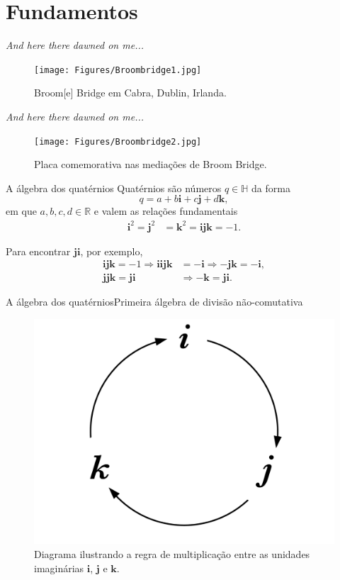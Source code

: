 \documentclass[10pt,compress]{beamer}
\newcommand{\qi}{\boldsymbol{i}}
\newcommand{\qj}{\boldsymbol{j}}
\newcommand{\qk}{\boldsymbol{k}}
\begin{document}
\section{Fundamentos}\label{sec:fundamentos}

\begin{frame}{\textit{And here there dawned on me...}}
\begin{figure}
\centering
\texttt{[image: Figures/Broombridge1.jpg]}
\caption{Broom[e] Bridge em Cabra, Dublin, Irlanda.}
\end{figure}
\end{frame}

\begin{frame}{\textit{And here there dawned on me...}}
\begin{figure}
\centering
\texttt{[image: Figures/Broombridge2.jpg]}
\caption{Placa comemorativa nas media\c c\~oes de Broom Bridge.}
\end{figure}
\end{frame}

\begin{frame}{A \'algebra dos quat\'ernios}
Quat\'ernios s\~ao n\'umeros $q \in \mathbb{H}$ da forma
\begin{equation}
q = a + b\qi + c\qj + d\qk,
\label{eq:q}
\end{equation}
em que $a, b, c, d \in \mathbb{R}$ e valem as rela\c c\~oes fundamentais
\begin{equation}
\label{eq:fund_rel}
\begin{aligned}
\qi ^2 = \qj^2 &=\qk^2 = \qi \qj \qk = -1.
\end{aligned}
\end{equation}

\pause
Para encontrar $ \qj \qi $, por exemplo,
\begin{equation}
\begin{aligned}
\qi \qj \qk = -1 \Rightarrow
\qi \qi \qj \qk &= -\qi \Rightarrow
- \qj \qk = - \qi, \\
\qj \qj \qk =  \qj \qi &\Rightarrow
- \qk =  \qj \qi.
\end{aligned}
\end{equation}
\end{frame}

\begin{frame}{A \'algebra dos quat\'ernios}{Primeira \'algebra de divis\~ao n\~ao-comutativa}
\begin{figure}
\centering
\includegraphics[width=0.3\linewidth]{Figures/quaternion_multiplication.pdf}
\caption{Diagrama ilustrando a regra de multiplica\c c\~ao entre as unidades imagin\'arias $ \qi $, $ \qj $ e $ \qk $.}
\label{fig:quatmult}
\end{figure}
\end{frame}
\end{document}
